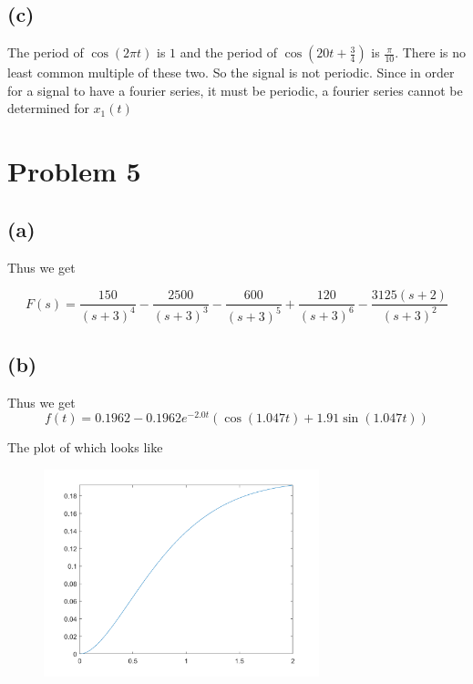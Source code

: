 \documentclass[12pt]{article}
\begin{document}
\subsection*{(c)}
The period of $\cos(2\pi t)$ is $1$ and the period of $\cos(20t+\frac{3}{4})$ is $\frac{\pi}{10}$. There is no least common multiple of these two. So the signal is not periodic. Since in order for a signal to have a fourier series, it must be periodic, a fourier series cannot be determined for $x_1(t)$
\section*{Problem 5}
\subsection*{(a)}

Thus we get

$$F(s)=\boxed{\frac{150}{(s + 3)^4} - \frac{2500}{(s + 3)^3} - \frac{600}{(s + 3)^5} + \frac{120}{(s + 3)^6} - \frac{3125(s + 2)}{(s + 3)^2}} $$ 
\subsection*{(b)}


Thus we get
$$f(t)=0.1962 - 0.1962e^{-2.0t}(\cos(1.047t) + 1.91\sin(1.047t))$$

The plot of which looks like
\begin{center}
\begin{figure}[h]\includegraphics[width=8cm]{fig4}
\end{figure}
\end{center}
\end{document}
